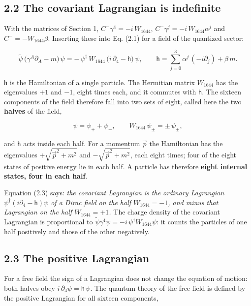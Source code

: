 \documentclass[
  10pt,
]{article}
\begin{document}
\hypertarget{the-covariant-lagrangian-is-indefinite}{%
\subsection{2.2 The covariant Lagrangian is
indefinite}\label{the-covariant-lagrangian-is-indefinite}}

With the matrices of Section 1, \(C^-\gamma^4=-i\,W_{1644}\),
\(C^-\gamma^j=-i\,W_{1644}\alpha^j\) and \(C^-=-W_{1644}\beta\).
Inserting these into Eq. (2.1) for a field of the quantized sector:

\[\tilde\psi\,\big(\gamma^A\partial_A-m\big)\,\psi=-\,\psi^\dagger\,W_{1644}\,\big(i\,\partial_4-\mathsf h\big)\,\psi,
\qquad\mathsf h=\sum_{j=0}^{3}\alpha^j\,(-i\partial_j)+\beta\,m.\tag{2.3}\]

\(\mathsf h\) is the Hamiltonian of a single particle. The Hermitian
matrix \(W_{1644}\) has the eigenvalues \(+1\) and \(-1\), eight times
each, and it commutes with \(\mathsf h\). The sixteen components of the
field therefore fall into two sets of eight, called here the two
\textbf{halves} of the field,

\[\psi=\psi_++\psi_-,\qquad W_{1644}\,\psi_\pm=\pm\,\psi_\pm,\tag{2.4}\]

and \(\mathsf h\) acts inside each half. For a momentum \(\vec p\) the
Hamiltonian has the eigenvalues \(+\sqrt{\vec p^2+m^2}\) and
\(-\sqrt{\vec p^2+m^2}\), each eight times; four of the eight states of
positive energy lie in each half. A particle has therefore \textbf{eight
internal states, four in each half}.

Equation (2.3) says: \emph{the covariant Lagrangian is the ordinary
Lagrangian \(\psi^\dagger(i\partial_4-\mathsf h)\psi\) of a Dirac field
on the half \(W_{1644}=-1\), and minus that Lagrangian on the half
\(W_{1644}=+1\).} The charge density of the covariant Lagrangian is
proportional to
\(\tilde\psi\gamma^4\psi=-i\,\psi^\dagger W_{1644}\psi\): it counts the
particles of one half positively and those of the other negatively.

\hypertarget{the-positive-lagrangian}{%
\subsection{2.3 The positive Lagrangian}\label{the-positive-lagrangian}}

For a free field the sign of a Lagrangian does not change the equation
of motion: both halves obey \(i\,\partial_4\psi=\mathsf h\,\psi\). The
quantum theory of the free field is defined by the positive Lagrangian
for all sixteen components,
\end{document}
